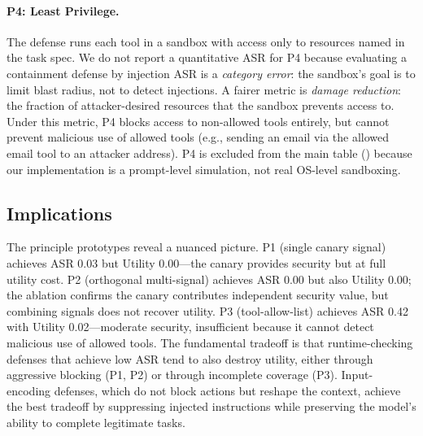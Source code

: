 \paragraph{P4: Least Privilege.}
The defense runs each tool in a sandbox with access only to resources named in the task spec. We do not report a quantitative ASR for P4 because evaluating a containment defense by injection ASR is a \emph{category error}: the sandbox's goal is to limit blast radius, not to detect injections. A fairer metric is \emph{damage reduction}: the fraction of attacker-desired resources that the sandbox prevents access to. Under this metric, P4 blocks access to non-allowed tools entirely, but cannot prevent malicious use of allowed tools (e.g., sending an email via the allowed email tool to an attacker address). P4 is excluded from the main table () because our implementation is a prompt-level simulation, not real OS-level sandboxing.

\subsection{Implications}

The principle prototypes reveal a nuanced picture. P1 (single canary signal) achieves ASR 0.03 but Utility 0.00---the canary provides security but at full utility cost. P2 (orthogonal multi-signal) achieves ASR 0.00 but also Utility 0.00; the ablation confirms the canary contributes independent security value, but combining signals does not recover utility. P3 (tool-allow-list) achieves ASR 0.42 with Utility 0.02---moderate security, insufficient because it cannot detect malicious use of allowed tools. The fundamental tradeoff is that runtime-checking defenses that achieve low ASR tend to also destroy utility, either through aggressive blocking (P1, P2) or through incomplete coverage (P3). Input-encoding defenses, which do not block actions but reshape the context, achieve the best tradeoff by suppressing injected instructions while preserving the model's ability to complete legitimate tasks.
